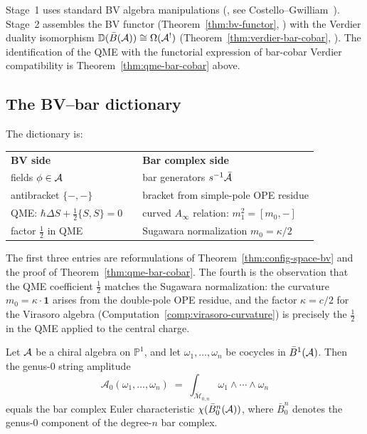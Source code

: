 \begin{remark}[Scope]
Stage~1 uses standard BV algebra manipulations (\ClaimStatusProvedElsewhere,
see Costello--Gwilliam~\cite{CG17}).  Stage~2 assembles the BV
functor (Theorem~\ref{thm:bv-functor}, \ClaimStatusProvedHere) with
the Verdier duality isomorphism $\mathbb{D}(\bar{B}(\mathcal{A})) \cong \Omega(\mathcal{A}^!)$
(Theorem~\ref{thm:verdier-bar-cobar}, \ClaimStatusProvedHere).  The
identification of the QME with the functorial expression of bar-cobar
Verdier compatibility is Theorem~\ref{thm:qme-bar-cobar} above.
\end{remark}

\subsection{The BV--bar dictionary}
\label{subsec:bv-bar-identification}

The dictionary is:
\begin{center}
\begin{tabular}{lcl}
\textbf{BV side} && \textbf{Bar complex side} \\[2pt]
fields $\phi \in \mathcal{A}$ && bar generators $s^{-1}\bar{\mathcal{A}}$ \\
antibracket $\{-,-\}$ && bracket from simple-pole OPE residue \\
QME: $\hbar\Delta S + \tfrac{1}{2}\{S,S\} = 0$
  && curved $A_\infty$ relation: $m_1^2 = [m_0, -]$ \\
factor $\tfrac{1}{2}$ in QME && Sugawara normalization $m_0 = \kappa/2$
\end{tabular}
\end{center}
The first three entries are reformulations of
Theorem~\ref{thm:config-space-bv} and the proof of
Theorem~\ref{thm:qme-bar-cobar}.  The fourth is the observation
that the QME coefficient $\tfrac{1}{2}$ matches the Sugawara
normalization: the curvature $m_0 = \kappa \cdot \mathbf{1}$ arises
from the double-pole OPE residue, and the factor $\kappa = c/2$ for
the Virasoro algebra (Computation~\ref{comp:virasoro-curvature})
is precisely the $\tfrac{1}{2}$ in the QME applied to the central
charge.

\begin{theorem}\label{thm:genus0-amplitude-bar}
Let $\mathcal{A}$ be a chiral algebra on $\mathbb{P}^1$, and let
$\omega_1, \ldots, \omega_n$ be cocycles in
$\bar{B}^1(\mathcal{A})$.  Then the genus-$0$ string amplitude
\[
\mathcal{A}_0(\omega_1, \ldots, \omega_n)
\;=\;
\int_{\overline{\mathcal{M}}_{0,n}}
  \omega_1 \wedge \cdots \wedge \omega_n
\]
equals the bar complex Euler characteristic
$\chi(\bar{B}^n_0(\mathcal{A}))$, where $\bar{B}^n_0$ denotes the
genus-$0$ component of the degree-$n$ bar complex.
\end{theorem}

